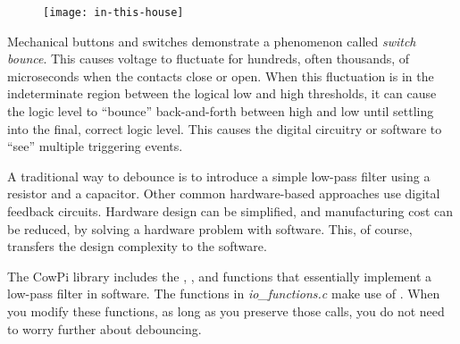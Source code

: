 \begin{figure}[h]
    \centering
    \texttt{[image: in-this-house]}
\end{figure}

Mechanical buttons and switches demonstrate a phenomenon called \textit{switch bounce}.
This causes voltage to fluctuate for hundreds, often thousands, of microseconds when the contacts close or open.
When this fluctuation is in the indeterminate region between the logical low and high thresholds, it can cause the logic level to ``bounce'' back-and-forth between high and low until settling into the final, correct logic level.
This causes the digital circuitry or software to ``see'' multiple triggering events.

A traditional way to debounce is to introduce a simple low-pass filter using a resistor and a capacitor.
Other common hardware-based approaches use digital feedback circuits.
Hardware design can be simplified, and manufacturing cost can be reduced, by solving a hardware problem with software.
This, of course, transfers the design complexity to the software.

The CowPi library includes the , , and   functions that essentially implement a low-pass filter in software.
The functions in \textit{io\_functions.c} make use of .
When you modify these functions, as long as you preserve those  calls, you do not need to worry further about debouncing.
